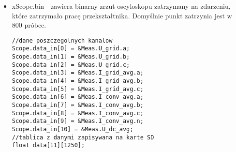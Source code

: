 \documentclass[12pt,a4paper]{article}
\begin{document}
\begin{itemize}
	\item xScope.bin - zawiera binarny zrzut oscyloskopu zatrzymany na zdarzeniu, które zatrzymało pracę przekształtnika. Domyślnie punkt zatrzynia jest w 800 próbce.

	\begin{lstlisting}[float=!h, style=customc, belowskip=-10pt]
//dane poszczegolnych kanalow
Scope.data_in[0] = &Meas.U_grid.a;
Scope.data_in[1] = &Meas.U_grid.b;
Scope.data_in[2] = &Meas.U_grid.c;
Scope.data_in[3] = &Meas.I_grid_avg.a;
Scope.data_in[4] = &Meas.I_grid_avg.b;
Scope.data_in[5] = &Meas.I_grid_avg.c;
Scope.data_in[6] = &Meas.I_conv_avg.a;
Scope.data_in[7] = &Meas.I_conv_avg.b;
Scope.data_in[8] = &Meas.I_conv_avg.c;
Scope.data_in[9] = &Meas.I_conv_avg.n;
Scope.data_in[10] = &Meas.U_dc_avg;
//tablica z danymi zapisywana na karte SD
float data[11][1250];
\end{lstlisting}

\end{itemize}
\end{document}
